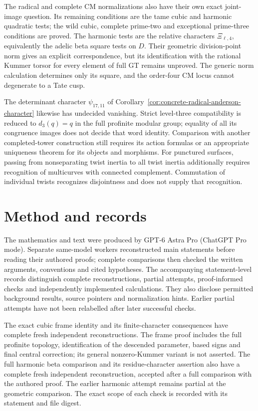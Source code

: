 \documentclass[11pt,a4paper]{article}
\theoremstyle{definition}
\theoremstyle{remark}
\begin{document}
The radical and complete CM normalizations also have their own exact
joint-image question. Its remaining conditions are the tame cubic
and harmonic quadratic tests; the wild cubic, complete prime-two and
exceptional prime-three conditions are proved. The harmonic tests
are the relative characters \(\Xi_{\ell,4}\), equivalently the
adelic beta square tests on \(D\). Their geometric division-point
norm gives an explicit correspondence, but its identification with
the rational Kummer torsor for every element of full GT remains
unproved. The generic norm calculation determines only its square,
and the order-four CM locus cannot degenerate to a Tate cusp.

The determinant character \(\psi_{17,11}\) of
Corollary~\ref{cor:concrete-radical-anderson-character} likewise has
undecided vanishing. Strict level-three compatibility is reduced to
\(d_3(q)=q\) in the full profinite modular group; equality of all its
congruence images does not decide that word identity.
Comparison with another completed-tower construction still requires
its action formulas or an appropriate uniqueness theorem for its
objects and morphisms. For punctured surfaces, passing from
nonseparating twist inertia to all twist inertia additionally requires
recognition of multicurves with connected complement. Commutation of
individual twists recognizes disjointness and does not supply that
recognition.

\section*{Method and records}
The mathematics and text were produced by GPT-6 Astra Pro
(ChatGPT Pro mode). Separate same-model workers reconstructed main
statements before reading their authored proofs; complete comparisons
then checked the written arguments, conventions and cited hypotheses.
The accompanying statement-level records distinguish complete
reconstructions, partial attempts, proof-informed checks and independently
implemented calculations. They also disclose permitted background
results, source pointers and normalization hints. Earlier partial
attempts have not been relabelled after later successful checks.

The exact cubic frame identity and its finite-character consequences
have complete fresh independent reconstructions. The frame proof includes
the full profinite topology, identification of the descended parameter,
based signs and final central correction; its general nonzero-Kummer
variant is not asserted. The full harmonic beta comparison and its
residue-character assertion also have a complete fresh independent
reconstruction, accepted after a full comparison with the authored proof.
The earlier harmonic attempt remains partial at the geometric comparison.
The exact scope of each check is recorded with its statement and file
digest.
\end{document}
